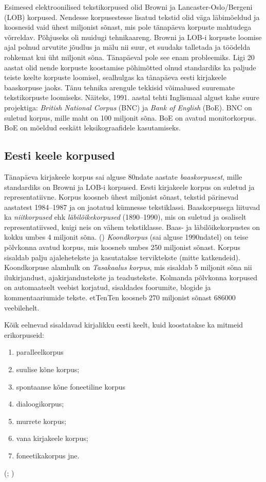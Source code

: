 \documentclass[12pt]{article}
\begin{document}
Esimesed elektroonilised tekstikorpused olid Browni ja Lancaster-Oslo/Bergeni (LOB) korpused. Nendesse korpusestesse lisatud tekstid olid väga läbimõeldud ja koosnesid vaid ühest miljonist sõnast, mis pole tänapäeva korpuste mahtudega võrreldav. Põhjuseks oli muidugi tehnikaareng. Browni ja LOB-i korpuste loomise ajal polnud arvutite jõudlus ja mälu nii suur, et suudaks talletada ja töödelda rohkemat kui üht miljonit sõna.
Tänapäeval pole see enam probleemiks. Ligi 20 aastat olid nende korpuste koostamise põhimõtted olnud standardiks ka paljude teiste keelte korpuste loomisel, sealhulgas ka tänapäeva eesti kirjakeele baaskorpuse jaoks. Tänu tehnika arengule tekkisid võimalused
suuremate tekstikorpuste loomiseks. Näiteks, 1991. aastal tehti Inglismaal algust kahe suure projektiga: \emph{British National Corpus} (BNC) ja \emph{Bank of English} (BoE). BNC on suletud korpus, mille maht on 100 miljonit sõna. BoE on avatud monitorkorpus. BoE on mõeldud eeskätt leksikograafidele kasutamiseks.
 \citep[9--11]{KR}


\subsection{Eesti keele korpused}

Tänapäeva kirjakeele korpus sai alguse 80ndate aastate \emph{baaskorpusest}, mille standardiks on Browni ja LOB-i korpused. Eesti kirjakeele korpus on suletud ja representatiivne. Korpus koosneb ühest miljonist sõnast, tekstid pärinevad aastatest 1984--1987 ja on jaotatud kümnesse tekstiklassi. Baaskorpusega liituvad ka \emph{niitkorpused} ehk \emph{läbilõikekorpused} (1890--1990), mis on suletud ja osaliselt representatiivsed, kuigi neis on vähem tekstiklasse. Baas- ja läbilõikekorpustes on kokku umbes 4 miljonit sõna. (\citealp[14--15]{KR}) \emph{Koondkorpus} (sai alguse 1990ndatel) on teise põlvkonna avatud korpus, mis koosneb umbes 250 miljonist sõnast. Korpus sisaldab palju ajalehetekste ja kasutatakse terviktekste (mitte katkendeid). Koondkorpuse alamhulk on \emph{Tasakaalus korpus}, mis sisaldab 5 miljonit sõna nii ilukirjandust, ajakirjandustekste ja teadustekste. Kolmanda põlvkonna korpused on automaatselt veebist korjatud, sisaldades foorumite, blogide ja kommentaariumide tekste. \citep[38]{M_OK2015} etTenTen koosneb 270 miljonist sõnast 686000 veebilehelt. \citep{etTenTen}

Kõik eelnevad sisaldavad kirjalikku eesti keelt, kuid koostatakse ka mitmeid erikorpuseid:

\begin{enumerate}
    \item paralleelkorpus
    \item suulise kõne korpus;
    \item spontaanse kõne foneetiline korpus
    \item dialoogikorpus;
    \item murrete korpus;
    \item vana kirjakeele korpus;
    \item foneetikakorpus jne.
\end{enumerate}
(\citealp{Keelekogu}; \citealp[17--22]{KR})
\end{document}
